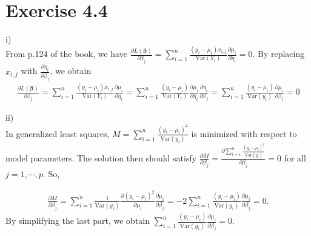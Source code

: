 \documentclass[a4paper]{article}
\newcommand{\Var}{\mathrm{Var}}
\begin{document}
\vspace{\baselineskip}
\section{Exercise 4.4}

i)\\
From p.124 of the book, we have $\frac{\partial L(\bm{\beta})}{\partial \beta_{j}} = \sum_{i=1}^{n}\frac{(y_{i}-\mu_{i})x_{i,j}}{\Var(Y_{i})}\frac{\partial \mu_{i}}{\partial \eta_{i}} = 0$. By replacing $x_{i,j}$ with $\frac{\partial \eta_{i}}{\partial \beta_{j}}$, we obtain
\begin{align*}
\frac{\partial L(\bm{\beta})}{\partial \beta_{j}} = \sum_{i=1}^{n}\frac{(y_{i}-\mu_{i})x_{i,j}}{\Var(Y_{i})}\frac{\partial \mu_{i}}{\partial \eta_{i}} = \sum_{i=1}^{n}\frac{(y_{i}-\mu_{i})}{\Var(Y_{i})}\frac{\partial \mu_{i}}{\partial \eta_{i}}\frac{\partial \eta_{i}}{\partial \beta_{j}} = \sum_{i=1}^{n}\frac{(y_{i}-\mu_{i})}{\Var(y_{i})}\frac{\partial \mu_{i}}{\partial \beta_{j}} = 0
\end{align*}

ii)\\
In generalized least squares, $M = \sum_{i=1}^{n}\frac{(y_{i}-\mu_{i})^{2}}{\Var(y_{i})}$ is minimized with respect to model parameters. The solution then should satisfy $\frac{\partial M}{\partial \beta_{j}} = \frac{\partial \sum_{i=1}^{n}\frac{(y_{i}-\mu_{i})^{2}}{\Var(y_{i})}}{\partial \beta_{j}} = 0$ for all $j =  1, \cdots, p$. So,

\begin{align*}
\frac{\partial M}{\partial \beta_{j}} = \sum_{i=1}^{n} \frac{1}{\Var(y_{i})}\frac{\partial (y_{i}-\mu_{i})^{2}}{\partial \mu_{i}}\frac{\partial \mu_{i}}{\partial \beta_{j}} = -2\sum_{i=1}^{n}\frac{(y_{i}-\mu_{i})}{\Var(y_{i})}\frac{\partial \mu_{i}}{\partial \beta_{j}} = 0.
\end{align*}
By simplifying the last part, we obtain $\sum_{i=1}^{n}\frac{(y_{i}-\mu_{i})}{\Var(y_{i})}\frac{\partial \mu_{i}}{\partial \beta_{j}} = 0$.



\vspace{\baselineskip}
\end{document}
